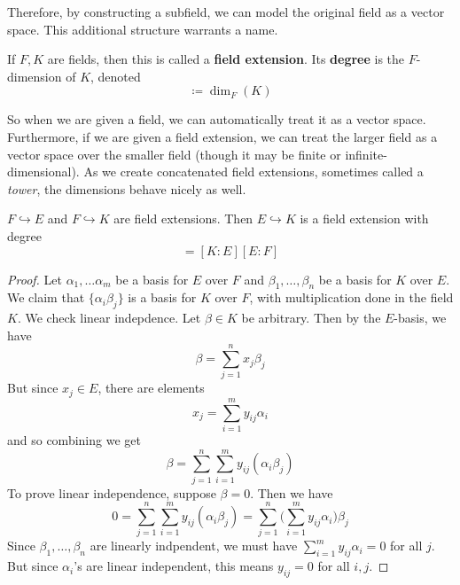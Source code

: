   Therefore, by constructing a subfield, we can model the original field as a vector space. This additional structure warrants a name. 

  \begin{definition}
    If $F, K$ are fields, then this is called a \textbf{field extension}. Its \textbf{degree} is the $F$-dimension of $K$, denoted
    \begin{equation}
      [K:F] \coloneqq \dim_F (K) 
    \end{equation}
  \end{definition} 

  So when we are given a field, we can automatically treat it as a vector space. Furthermore, if we are given a field extension, we can treat the larger field as a vector space over the smaller field (though it may be finite or infinite-dimensional). As we create concatenated field extensions, sometimes called a \textit{tower}, the dimensions behave nicely as well. 

  \begin{theorem}[]
    $F \hookrightarrow E$ and $F \hookrightarrow K$ are field extensions. Then $E \hookrightarrow K$ is a field extension with degree 
    \begin{equation}
      [K:E] = [K:E] [E:F]
    \end{equation}
  \end{theorem}
  \begin{proof}
    Let $\alpha_1, \ldots \alpha_m$ be a basis for $E$ over $F$ and $\beta_1, \ldots, \beta_n$ be a basis for $K$ over $E$. We claim that $\{\alpha_i \beta_j\}$ is a basis for $K$ over $F$, with multiplication done in the field $K$. We check linear indepdence. Let $\beta \in K$ be arbitrary. Then by the $E$-basis, we have 
    \begin{equation}
      \beta = \sum_{j=1}^n x_j \beta_j
    \end{equation} 
    But since $x_j \in E$, there are elements 
    \begin{equation}
      x_j = \sum_{i=1}^m y_{ij} \alpha_i
    \end{equation}
    and so combining we get 
    \begin{equation}
      \beta = \sum_{j=1}^n \sum_{i=1}^m y_{ij} (\alpha_i \beta_j) 
    \end{equation}
    To prove linear independence, suppose $\beta = 0$. Then we have 
    \begin{equation}
      0 = \sum_{j=1}^n \sum_{i=1}^m y_{ij} (\alpha_i \beta_j) = \sum_{j=1}^n \bigg( \sum_{i=1}^m y_{ij} \alpha_i \bigg) \beta_j 
    \end{equation}
    Since $\beta_1, \ldots, \beta_n$ are linearly indpendent, we must have $\sum_{i=1}^m y_{ij} \alpha_i = 0$ for all $j$. But since $\alpha_i$'s are linear independent, this means $y_{ij} = 0$ for all $i, j$. 
  \end{proof} 

